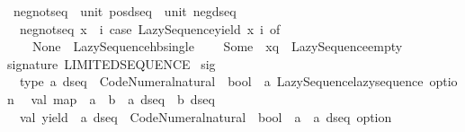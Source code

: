 \begin{isabellebody}
\isanewline
{}\isamarkupfalse%
\ neg{\isacharunderscore}{\kern0pt}not{\isacharunderscore}{\kern0pt}seq\ {\isacharcolon}{\kern0pt}{\isacharcolon}{\kern0pt}\ {\isachardoublequoteopen}unit\ pos{\isacharunderscore}{\kern0pt}dseq\ {\isasymRightarrow}\ unit\ neg{\isacharunderscore}{\kern0pt}dseq{\isachardoublequoteclose}\isanewline
{}\isanewline
\ \ {\isachardoublequoteopen}neg{\isacharunderscore}{\kern0pt}not{\isacharunderscore}{\kern0pt}seq\ x\ {\isacharequal}{\kern0pt}\ {\isacharparenleft}{\kern0pt}{\isasymlambda}i{\isachardot}{\kern0pt}\ case\ Lazy{\isacharunderscore}{\kern0pt}Sequence{\isachardot}{\kern0pt}yield\ {\isacharparenleft}{\kern0pt}x\ i{\isacharparenright}{\kern0pt}\ of\isanewline
\ \ \ \ None\ {\isasymRightarrow}\ Lazy{\isacharunderscore}{\kern0pt}Sequence{\isachardot}{\kern0pt}hb{\isacharunderscore}{\kern0pt}single\ {\isacharparenleft}{\kern0pt}{\isacharparenright}{\kern0pt}\isanewline
\ \ {\isacharbar}{\kern0pt}\ Some\ {\isacharparenleft}{\kern0pt}{\isacharparenleft}{\kern0pt}{\isacharparenright}{\kern0pt}{\isacharcomma}{\kern0pt}\ xq{\isacharparenright}{\kern0pt}\ {\isasymRightarrow}\ Lazy{\isacharunderscore}{\kern0pt}Sequence{\isachardot}{\kern0pt}empty{\isacharparenright}{\kern0pt}{\isachardoublequoteclose}\isanewline
\isanewline
%
\isadelimML
\isanewline
%
\endisadelimML
%
\isatagML
{}\isamarkupfalse%
\ {\isacartoucheopen}\isanewline
signature\ LIMITED{\isacharunderscore}{\kern0pt}SEQUENCE\ {\isacharequal}{\kern0pt}\isanewline
sig\isanewline
\ \ type\ {\isacharprime}{\kern0pt}a\ dseq\ {\isacharequal}{\kern0pt}\ Code{\isacharunderscore}{\kern0pt}Numeral{\isachardot}{\kern0pt}natural\ {\isacharminus}{\kern0pt}{\isachargreater}{\kern0pt}\ bool\ {\isacharminus}{\kern0pt}{\isachargreater}{\kern0pt}\ {\isacharprime}{\kern0pt}a\ Lazy{\isacharunderscore}{\kern0pt}Sequence{\isachardot}{\kern0pt}lazy{\isacharunderscore}{\kern0pt}sequence\ option\isanewline
\ \ val\ map\ {\isacharcolon}{\kern0pt}\ {\isacharparenleft}{\kern0pt}{\isacharprime}{\kern0pt}a\ {\isacharminus}{\kern0pt}{\isachargreater}{\kern0pt}\ {\isacharprime}{\kern0pt}b{\isacharparenright}{\kern0pt}\ {\isacharminus}{\kern0pt}{\isachargreater}{\kern0pt}\ {\isacharprime}{\kern0pt}a\ dseq\ {\isacharminus}{\kern0pt}{\isachargreater}{\kern0pt}\ {\isacharprime}{\kern0pt}b\ dseq\isanewline
\ \ val\ yield\ {\isacharcolon}{\kern0pt}\ {\isacharprime}{\kern0pt}a\ dseq\ {\isacharminus}{\kern0pt}{\isachargreater}{\kern0pt}\ Code{\isacharunderscore}{\kern0pt}Numeral{\isachardot}{\kern0pt}natural\ {\isacharminus}{\kern0pt}{\isachargreater}{\kern0pt}\ bool\ {\isacharminus}{\kern0pt}{\isachargreater}{\kern0pt}\ {\isacharparenleft}{\kern0pt}{\isacharprime}{\kern0pt}a\ {\isacharasterisk}{\kern0pt}\ {\isacharprime}{\kern0pt}a\ dseq{\isacharparenright}{\kern0pt}\ option\isanewline

\end{isabellebody}
